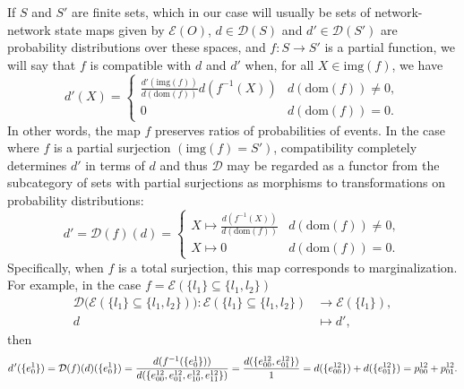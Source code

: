 \documentclass[10pt]{article}
\def\expr{\mathcal{E}}
\def\dist{\mathcal{D}}
\def\gnpm{network-network state maps} %
\providecommand{\DIFaddend}{} %
\begin{document}
\DIFaddend If $S$ and $S'$ are finite sets, which in our case will usually be sets of \gnpm{} given by $\mathcal{E}(O)$, $d \in \dist(S)$ and $d' \in \dist(S')$ are probability distributions over these spaces, and $f \colon S \to S'$ is a partial function, we will say that $f$ is compatible with $d$ and $d'$ when, for all $X \in \mathrm{img}(f)$, we have
\begin{equation}
 d'(X) =
  \begin{cases}
    \frac{d'(\mathrm{img}(f))}{d(\mathrm{dom}(f))}d(f^{-1}(X)) & d(\mathrm{dom}(f)) \neq 0, \\
    0 & d(\mathrm{dom}(f)) = 0.
  \end{cases}
\end{equation}
In other words, the map $f$ preserves ratios of probabilities of events.  In the case where $f$ is a partial surjection $(\mathrm{img}(f)=S')$, compatibility completely determines $d'$ in terms of $d$ and thus $\dist$ may be regarded as a functor from the subcategory of sets with partial surjections as morphisms to transformations on probability distributions:
\begin{equation}\label{eq:distfunctor}
 d' = \dist(f)(d) =
  \begin{cases}
    X \mapsto \frac{d(f^{-1}(X))}{d(\mathrm{dom}(f))} & d(\mathrm{dom}(f)) \neq 0, \\
    X \mapsto 0 & d(\mathrm{dom}(f)) = 0.
  \end{cases}
\end{equation}
Specifically, when $f$ is a total surjection, this map corresponds to marginalization. For example, in the case $f = \expr ( \{ l_1 \} \! \subseteq \! \{ l_1, l_2 \} )$
\begin{equation}\label{eq:dfunctorex}
\begin{split}
\dist \big(\expr ( \{ l_1 \} \! \subseteq \! \{ l_1, l_2 \} ) \big) \colon \expr ( \{ l_1 \} \! \subseteq \! \{ l_1, l_2 \} ) &\to \expr ( \{ l_1 \} ), \\
d &\mapsto d',
\end{split}
\end{equation}
then
\begin{equation}\label{eq:margexample}
d\hspace{.09em}'(\{e^1_0\}) = \dist (f)(d)(\{e^1_0\}) = \frac{d(f^{-1}(\{ e^1_0\}))}{d(\{ e^{12}_{00},e^{12}_{01},e^{12}_{10},e^{12}_{11} \})} = \frac{d(\{ e^{12}_{00},e^{12}_{01}\})}{1} = d( \{ e^{12}_{00} \} ) + d( \{ e^{12}_{01} \} ) = p^{12}_{00} + p^{12}_{01}.
\end{equation}
\end{document}
